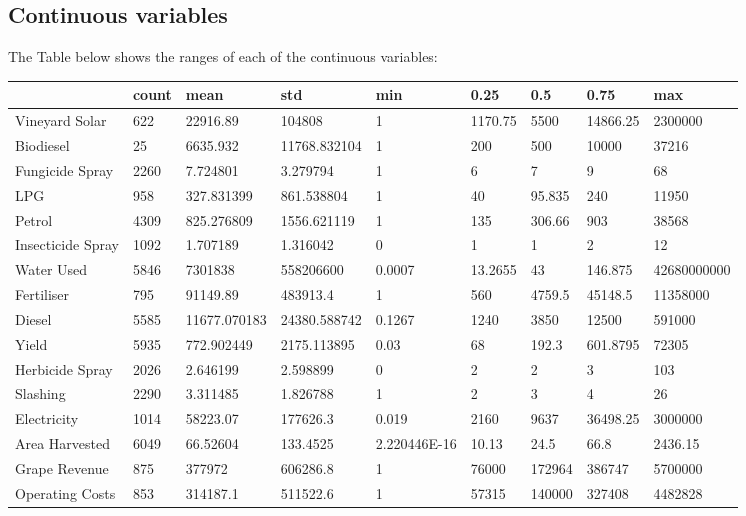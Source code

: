 \documentclass[review,12pt,authoryear]{elsarticle}
\begin{document}
\begin{linenumbers}



 \appendix

 \section{Continuous variables}

The Table below shows the ranges of each of the continuous variables:
\begin{table}[]
  \begin{tabular}{@{}lllllllll@{}}
  \toprule
   & count & mean & std & min & 0.25 & 0.5 & 0.75 & max \\ \midrule
  Vineyard Solar & 622 & 22916.89 & 104808 & 1 & 1170.75 & 5500 & 14866.25 & 2300000 \\
  Biodiesel & 25 & 6635.932 & 11768.832104 & 1 & 200 & 500 & 10000 & 37216 \\
  Fungicide Spray & 2260 & 7.724801 & 3.279794 & 1 & 6 & 7 & 9 & 68 \\
  LPG & 958 & 327.831399 & 861.538804 & 1 & 40 & 95.835 & 240 & 11950 \\
  Petrol & 4309 & 825.276809 & 1556.621119 & 1 & 135 & 306.66 & 903 & 38568 \\
  Insecticide Spray & 1092 & 1.707189 & 1.316042 & 0 & 1 & 1 & 2 & 12 \\
  Water Used & 5846 & 7301838 & 558206600 & 0.0007 & 13.2655 & 43 & 146.875 & 42680000000 \\
  Fertiliser & 795 & 91149.89 & 483913.4 & 1 & 560 & 4759.5 & 45148.5 & 11358000 \\
  Diesel & 5585 & 11677.070183 & 24380.588742 & 0.1267 & 1240 & 3850 & 12500 & 591000 \\
  Yield & 5935 & 772.902449 & 2175.113895 & 0.03 & 68 & 192.3 & 601.8795 & 72305 \\
  Herbicide Spray & 2026 & 2.646199 & 2.598899 & 0 & 2 & 2 & 3 & 103 \\
  Slashing & 2290 & 3.311485 & 1.826788 & 1 & 2 & 3 & 4 & 26 \\
  Electricity & 1014 & 58223.07 & 177626.3 & 0.019 & 2160 & 9637 & 36498.25 & 3000000 \\
  Area Harvested & 6049 & 66.52604 & 133.4525 & 2.220446E-16 & 10.13 & 24.5 & 66.8 & 2436.15 \\
  Grape Revenue & 875 & 377972 & 606286.8 & 1 & 76000 & 172964 & 386747 & 5700000 \\
  Operating Costs & 853 & 314187.1 & 511522.6 & 1 & 57315 & 140000 & 327408 & 4482828 \\ \bottomrule
  \end{tabular}
  \end{table}


\end{linenumbers}
\end{document}

